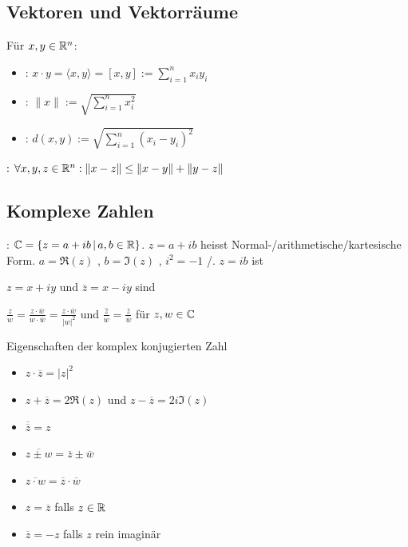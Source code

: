 \subsection{Vektoren und Vektorräume}

\Def Für $x, y \in \mathbb{R}^n$:
\vspace{-0.6em}
\begin{itemize}
    \item {}: $x \cdot y = \langle x,y\rangle = [x,y] := \sum_{i=1}^{n}x_i y_i$
    \item {}: $\|x\| := \sqrt{\sum_{i=1}^{n}x_i^2}$
    \item {}: $d(x,y) := \sqrt{\sum_{i=1}^{n}(x_i-y_i)^2}$
\end{itemize}

\Satz {}: $\forall x,y,z \in \mathbb{R}^n : \|x-z\|\le \|x-y\| + \|y - z\|$

\subsection{Komplexe Zahlen}

\Def {}: $\mathbb{C} = \{z = a + ib \, | \, a,b \in \mathbb{R}\}$.
$z = a + ib$ heisst Normal-/arithmetische/kartesische Form. $a = \Re(z)$ ,
$b = \Im(z)$ , $i^2 = -1$ /. $z = ib$ ist 

\Def $z = x + iy$ und $\overline{z} = x - iy$ sind 

\Satz $\frac{z}{w} = \frac{z \cdot \overline{w}}{w \cdot \overline{w}} = \frac{z \cdot \overline{w}}{|w|^2}$
und $\overline{\frac{z}{w}} = \frac{\overline{z}}{\overline{w}}$ für $z,w \in \mathbb{C}$

\Satz Eigenschaften der komplex konjugierten Zahl
\vspace{-0.6em}
\begin{itemize}
    \item $z \cdot \overline{z} = |z|^2$
    \item $z + \overline{z} = 2\Re(z)$ und $z - \overline{z} = 2i\Im(z)$
    \item $\overline{\overline{z}} = z$
    \item $\overline{z \pm w} = \overline{z} \pm \overline{w}$
    \item $\overline{z \cdot w} = \overline{z} \cdot \overline{w}$
    \item $z = \overline{z}$ falls $z \in \mathbb{R}$
    \item $\overline{z} = -z$ falls $z$ rein imaginär
\end{itemize}

